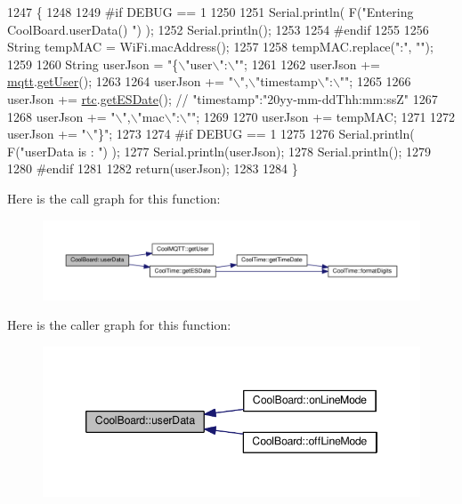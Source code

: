 \begin{DoxyCode}
1247 \{
1248 
1249 \textcolor{preprocessor}{#if DEBUG == 1}
1250 
1251     Serial.println( F(\textcolor{stringliteral}{"Entering CoolBoard.userData() "}) );
1252     Serial.println();
1253 
1254 \textcolor{preprocessor}{#endif}
1255 
1256     String tempMAC = WiFi.macAddress();
1257 
1258     tempMAC.replace(\textcolor{stringliteral}{":"}, \textcolor{stringliteral}{""});
1259 
1260     String userJson = \textcolor{stringliteral}{"\{\(\backslash\)"user\(\backslash\)":\(\backslash\)""};
1261 
1262     userJson += \hyperlink{class_cool_board_a2399f44d7c23c1149a335cb3b46d90f1}{mqtt}.\hyperlink{class_cool_m_q_t_t_a373cc92fca7760d886f02d8a6e5b3f63}{getUser}();
1263 
1264     userJson += \textcolor{stringliteral}{"\(\backslash\)",\(\backslash\)"timestamp\(\backslash\)":\(\backslash\)""};
1265 
1266     userJson += \hyperlink{class_cool_board_a50d2a6716879d64a85f3c6b44ad63275}{rtc}.\hyperlink{class_cool_time_ac4f32ee513c1328d984306645e8785a4}{getESDate}(); \textcolor{comment}{// "timestamp":"20yy-mm-ddThh:mm:ssZ"}
1267 
1268     userJson += \textcolor{stringliteral}{"\(\backslash\)",\(\backslash\)"mac\(\backslash\)":\(\backslash\)""};
1269 
1270     userJson += tempMAC;
1271 
1272     userJson += \textcolor{stringliteral}{"\(\backslash\)"\}"};
1273 
1274 \textcolor{preprocessor}{#if DEBUG == 1}
1275 
1276     Serial.println( F(\textcolor{stringliteral}{"userData is : "}) );
1277     Serial.println(userJson);
1278     Serial.println();
1279 
1280 \textcolor{preprocessor}{#endif  }
1281     
1282     \textcolor{keywordflow}{return}(userJson);
1283     
1284 \}
\end{DoxyCode}
Here is the call graph for this function\+:
\nopagebreak
\begin{figure}[H]
\begin{center}
\leavevmode
\includegraphics[width=350pt]{d7/df9/class_cool_board_ae7358fb6e623cfc81b775f5f1734909b_cgraph}
\end{center}
\end{figure}
Here is the caller graph for this function\+:
\nopagebreak
\begin{figure}[H]
\begin{center}
\leavevmode
\includegraphics[width=346pt]{d7/df9/class_cool_board_ae7358fb6e623cfc81b775f5f1734909b_icgraph}
\end{center}
\end{figure}


